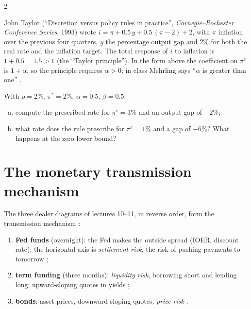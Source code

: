 \begin{paracol}{2}
\begin{coursenote}
John Taylor (``Discretion versus policy rules in practice'', \emph{Carnegie--Rochester Conference Series}, 1993) wrote $i = \pi + 0.5\,y + 0.5\,(\pi-2) + 2$, with
$\pi$ inflation over the previous four quarters, $y$ the percentage output gap and 2\% for both the real rate and the inflation target. The total response of $i$ to
inflation is $1+0.5=1.5>1$ (the ``Taylor principle''). In the form above the coefficient on $\pi^e$ is $1+\alpha$, so the principle requires $\alpha>0$; in class
Mehrling says ``$\alpha$ is greater than one'' .
\end{coursenote}

\begin{exercise}
With $\rho=2\%$, $\pi^\ast=2\%$, $\alpha=0.5$, $\beta=0.5$:
\begin{enumerate}[(a)]
  \item compute the prescribed rate for $\pi^e=3\%$ and an output gap of $-2\%$;
  \item what rate does the rule prescribe for $\pi^e=1\%$ and a gap of $-6\%$? What happens at the zero lower bound?
\end{enumerate}
\end{exercise}

\section{The monetary transmission mechanism}\label{sec:lr-transmission}

The three dealer diagrams of lectures 10--11, in reverse order, form the transmission mechanism :
\begin{enumerate}
  \item \textbf{Fed funds} (overnight): the Fed makes the outside spread (IOER, discount rate); the horizontal axis is \emph{settlement risk}, the risk of pushing payments to
        tomorrow ;
  \item \textbf{term funding} (three months): \emph{liquidity risk}, borrowing short and lending long; upward-sloping quotes in yields ;
  \item \textbf{bonds}: asset prices, downward-sloping quotes; \emph{price risk} .
\end{enumerate}


\end{paracol}
